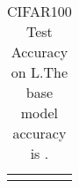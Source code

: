 \documentclass[10pt,twocolumn,letterpaper]{article}
\begin{document}
\begin{table}[ht]
\begin{center}
\begin{tabular}{c c}
\begin{minipage}{0.5\linewidth}
        \caption{CIFAR100 Test Accuracy on L.The base model accuracy is .}
        
        \label{tab:CIFAR100_tab16_supp}
        
    \end{minipage}
    
    
        
        \end{tabular}
        
\end{center}
\end{table}
\end{document}
